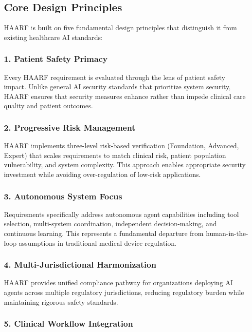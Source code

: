 \documentclass[11pt]{article}
\begin{document}
\subsection{Core Design Principles}

HAARF is built on five fundamental design principles that distinguish it from existing healthcare AI standards:

\subsubsection{1. Patient Safety Primacy}

Every HAARF requirement is evaluated through the lens of patient safety impact. Unlike general AI security standards that prioritize system security, HAARF ensures that security measures enhance rather than impede clinical care quality and patient outcomes.

\subsubsection{2. Progressive Risk Management}

HAARF implements three-level risk-based verification (Foundation, Advanced, Expert) that scales requirements to match clinical risk, patient population vulnerability, and system complexity. This approach enables appropriate security investment while avoiding over-regulation of low-risk applications.

\subsubsection{3. Autonomous System Focus}

Requirements specifically address autonomous agent capabilities including tool selection, multi-system coordination, independent decision-making, and continuous learning. This represents a fundamental departure from human-in-the-loop assumptions in traditional medical device regulation.

\subsubsection{4. Multi-Jurisdictional Harmonization}

HAARF provides unified compliance pathway for organizations deploying AI agents across multiple regulatory jurisdictions, reducing regulatory burden while maintaining rigorous safety standards.

\subsubsection{5. Clinical Workflow Integration}
\end{document}
